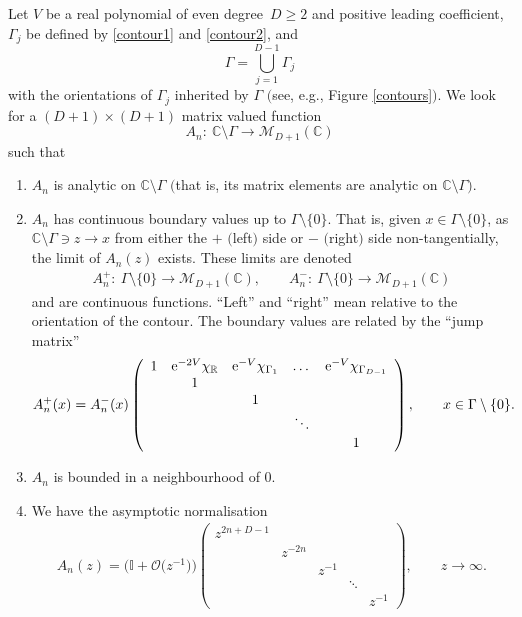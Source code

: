 \begin{rhp}\label{evenrhp} Let $V$ be a real polynomial of even degree~${D \geq 2}$ and positive leading coefficient, $\Gamma_j$ be defined by \eqref{contour1} and \eqref{contour2}, and
\begin{equation}\label{gamma}
\Gamma = \bigcup_{j=1}^{D-1} \Gamma_j
\end{equation}
with the orientations of $\Gamma_j$ inherited by $\Gamma$ $($see, e.g., Figure {\rm\ref{contours}}$)$. We look for a $(D+1) \times (D+1)$ matrix valued function
\begin{equation*}
A_{n} \colon\ \mathbb{C}\setminus \Gamma \longrightarrow \mathcal{M}_{D+1}(\mathbb{C})
\end{equation*}
such that
\begin{enumerate}\itemsep=0pt
\item[$(1)$] $A_{n}$ is analytic on $\mathbb{C}\setminus \Gamma$ $($that is, its matrix elements are analytic on $\mathbb{C}\setminus \Gamma)$.
\item[$(2)$] $A_{n}$ has continuous boundary values up to $\Gamma \setminus \{ 0 \}$. That is, given $x \in \Gamma \setminus \{ 0 \}$, as $\mathbb{C}\setminus \Gamma \ni z \to x$ from either the $+$ $($left$)$ side or $-$ $($right$)$ side non-tangentially, the limit of $A_{n}(z)$ exists. These limits are denoted
\begin{align*}
A_{n}^+ \colon\ \Gamma \setminus \{ 0 \} \longrightarrow \mathcal{M}_{D+1}(\mathbb{C}),\qquad
A_{n}^- \colon\ \Gamma \setminus \{ 0 \} \longrightarrow \mathcal{M}_{D+1}(\mathbb{C})
\end{align*}
and are continuous functions. \enquote{Left} and \enquote{right} mean relative to the orientation of the contour. The boundary values are related by the \enquote{jump matrix}
\begin{align*}
A_{n}^{+}(x) = A_{n}^{-}(x)\left(
\begin{array}{ccccccccccccccccccc}
1 & {\rm e}^{-2V} \chi_\mathbb{R} & {\rm e}^{-V} \chi_{\Gamma_1} & \dots & {\rm e}^{-V} \chi_{\Gamma_{D-1}} \\
& 1 \\
& & 1 \\
& & & \ddots \\
& & & & 1 \\
\end{array} \right), \qquad x \in \Gamma \setminus \{ 0 \}.
\end{align*}
\item[$(3)$] $A_{n}$ is bounded in a neighbourhood of $0$.
\item[$(4)$] We have the asymptotic normalisation
\begin{align*}
A_{n}(z) = \big(\mathbb{I}+ \mathcal{O}\big(z^{-1}\big)\big) \left(\begin{matrix}
z^{2n+D-1} \\
& z^{-2n} \\
& & z^{-1} \\
& & & \ddots \\
& & & & z^{-1}
\end{matrix} \right),\qquad z \to \infty.
\end{align*}
\end{enumerate}
\end{rhp}

